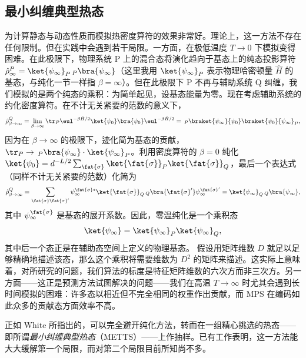 \subsection{最小纠缠典型热态}
为计算静态与动态性质而模拟热密度算符的效果非常好。理论上，这一方法不存在任何限制。但在实践中会遇到若干局限。一方面，在极低温度 $T\rightarrow 0$ 下模拟变得困难。在此极限下，物理系统 P 上的混合态将演化趋向于基态上的纯态投影算符 $\hat{\rho}^P_\infty = \ket{\psi_\infty}_P \phantom{\,}_P\bra{\psi_\infty}$（这里我用 $\ket{\psi_\infty}_P$ 表示物理哈密顿量 $\hat{H}$ 的基态，与纯化一节一样指 $\beta=\infty$）。但在此极限下 P 不再与辅助系统 Q 纠缠，我们模拟的是两个纯态的乘积：为简单起见，设基态能量为零。现在考虑辅助系统的约化密度算符。在不计无关紧要的范数的意义下，
\begin{equation}
\hat{\rho}^Q_{\beta\rightarrow\infty} = \lim_{\beta\rightarrow\infty} \tr_P \eul^{-\beta\hat{H}/2} \ket{\psi_0} \bra{\psi_0} \eul^{-\beta\hat{H}/2} = \phantom{\,}_P\braket{\psi_\infty}{\psi_0} \braket{\psi_0}{\psi_\infty}_P ,
\end{equation}
因为在 $\beta\rightarrow\infty$ 的极限下，迹化简为基态的贡献，
$\tr_P \rightarrow \phantom{\,}_P\bra{\psi_\infty} \cdot \ket{\psi_\infty}_P$。利用密度算符的 $\beta=0$ 纯化 $\ket{\psi_0} = d^{-L/2} \sum_{\fat{\sigma}} \ket{\fat{\sigma}}_P \ket{\fat{\sigma}}_Q$，最后一个表达式（同样不计无关紧要的范数）化简为
\begin{equation}
\hat{\rho}^Q_{\beta\rightarrow\infty} = \sum_{\fat{\sigma}\fat{\sigma}'} \psi^{\fat{\sigma}*}_\infty \ket{\fat{\sigma}}_Q \phantom{\,}_Q \bra{\fat{\sigma}'} \psi^{\fat{\sigma}'}_\infty =
\ket{\psi_\infty}_Q \phantom{\,}_Q \bra{\psi_\infty} ,
\end{equation}
其中 $\psi^{\fat{\sigma}}_\infty$ 是基态的展开系数。因此，零温纯化是一个乘积态
\begin{equation}
\ket{\psi_\infty} = \ket{\psi_\infty}_P \ket{\psi_\infty}_Q,
\end{equation}
其中后一个态正是在辅助态空间上定义的物理基态。
假设用矩阵维数 $D$ 就足以足够精确地描述该态，那么这个乘积将需要维数为 $D^2$ 的矩阵来描述。这实际上意味着，对所研究的问题，我们算法的标度是特征矩阵维数的六次方而非三次方。另一方面——这正是预测方法试图解决的问题——我们在高温 $T\rightarrow\infty$ 时尤其会遇到长时间模拟的困难：许多态以相近但不完全相同的权重作出贡献，而 MPS 在编码如此众多的贡献态方面效率不高。

正如 White \cite{Stoudenmire10,White09} 所指出的，可以完全避开纯化方法，转而在一组精心挑选的热态——即所谓{\em 最小纠缠典型热态}（METTS）——上作抽样。已有工作表明，这一方法能大大缓解第一个局限，而对第二个局限目前所知尚不多。

